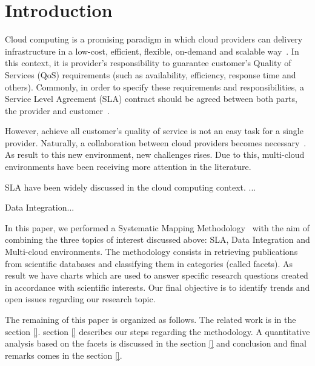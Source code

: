\section{Introduction}
\label{sec:intro}

Cloud computing is a promising paradigm in which cloud providers can delivery infrastructure in 
a low-cost, efficient, flexible, on-demand and scalable way~\cite{014}.
In this context, it is provider's responsibility to guarantee customer's Quality
of Services (QoS) requirements (such as availability, efficiency, response time
and others).
Commonly, in order to specify these requirements and responsibilities, a Service
Level Agreement (SLA) contract should be agreed between both parts, the provider and customer~\cite{011}.

However, achieve all customer's quality of service is not an easy task for a single provider.
Naturally, a collaboration between cloud providers becomes necessary~\cite{036}.
As result to this new environment, new challenges rises.
Due to this, multi-cloud environments have been receiving more attention in the literature.

SLA have been widely discussed in the cloud computing context. ...

Data Integration...

In this paper, we performed a Systematic Mapping Methodology~\cite{SM:Petersen:2008} with the aim of
combining the three topics of interest discussed above: SLA, Data Integration and Multi-cloud environments.
The methodology consists in retrieving publications from scientific databases and classifying them in
categories (called facets). As result we have charts which are used to answer specific research questions
created in accordance with scientific interests. 
Our final objective is to identify trends and open issues regarding our research topic.

The remaining of this paper is organized as follows. 
The related work is in the section \ref{}. 
section \ref{} describes our steps regarding the methodology.
A quantitative analysis based on the facets is discussed in the section \ref{} and conclusion and final
remarks comes in the section \ref{}. 